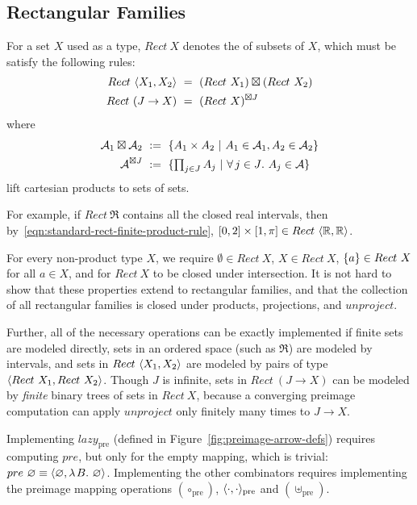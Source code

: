 \documentclass[preprint]{sigplanconf}
\newcommand{\arrowlazy}{\ensuremath{lazy}}
\newcommand{\pre}{_\mathrm{pre}}
\newcommand{\lazypre}{\arrowlazy\pre}
\begin{document}
\subsection{Rectangular Families}

\begin{definition}
For a set $X$ used as a type, $Rect~X$ denotes the  of subsets of $X$, which must be satisfy the following rules:
\begin{align}
	Rect~\langle{X_1,X_2}\rangle &\ = \ (Rect~X_1) \boxtimes (Rect~X_2)
	\label{eqn:standard-rect-finite-product-rule}
\\
	Rect~(J \to X) &\ = \ (Rect~X)^{\boxtimes J}
	\label{eqn:standard-rect-arbitrary-product-rule}
\end{align}
where
\begin{align}
	\mathcal{A}_1 \boxtimes \mathcal{A}_2 &\ := \ \lbrace {A_1 \times A_2} \ \lvert\ {A_1 \in \mathcal{A}_1, A_2 \in \mathcal{A}_2} \rbrace \\
	\mathcal{A}^{\boxtimes J} &\ := \ \lbrace {\textstyle\prod_{j \in J} A_j} \ \lvert\ {\forall\,{j \in J}\ldotp\,{A_j \in \mathcal{A}}} \rbrace
\end{align}
lift cartesian products to sets of sets.
\label{def:standard-rectangle}
\end{definition}

For example, if $Rect~\Re$ contains all the closed real intervals, then by~\eqref{eqn:standard-rect-finite-product-rule}, $[0,2] \times [1,\pi] \in Rect~\langle{\mathbb{R},\mathbb{R}}\rangle$.

For every non-product type $X$, we require $\emptyset \in Rect~X$, $X \in Rect~X$, $\{{a}\} \in Rect~X$ for all $a \in X$, and for $Rect~X$ to be closed under intersection.
It is not hard to show that these properties extend to rectangular families, and that the collection of all rectangular families is closed under products, projections, and $unproject$.

Further, all of the necessary operations can be exactly implemented if finite sets are modeled directly, sets in an ordered space (such as $\Re$) are modeled by intervals, and sets in $Rect~\langle{X_1,X_2}\rangle$ are modeled by pairs of type $\langle{Rect~X_1,Rect~X_2}\rangle$.
Though $J$ is infinite, sets in $Rect~(J \to X)$ can be modeled by \emph{finite} binary trees of sets in $Rect~X$, because a converging preimage computation can apply $unproject$ only finitely many times to $J \to X$.

Implementing $\lazypre$ (defined in Figure~\ref{fig:preimage-arrow-defs}) requires computing $pre$, but only for the empty mapping, which is trivial: $pre~\varnothing \equiv \langle{\varnothing,\lambda\mspace{2mu}{B}\ldotp\,\varnothing}\rangle$.
Implementing the other combinators requires implementing the preimage mapping operations $(\circ\pre)$, $\pair{\cdot,\cdot}\pre$ and $(\uplus\pre)$.
\end{document}

